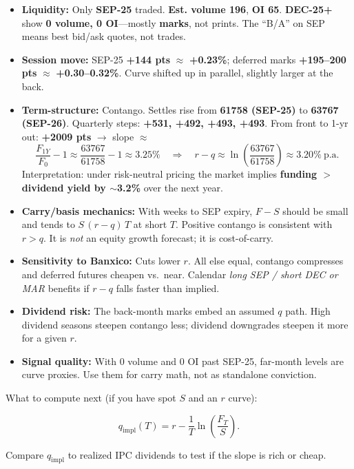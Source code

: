 \documentclass[11pt,a4paper]{article} %
\begin{document}
\begin{itemize}
  \item \textbf{Liquidity:} Only \textbf{SEP-25} traded. \textbf{Est. volume 196}, \textbf{OI 65}. \textbf{DEC-25+} show \textbf{0 volume, 0 OI}---mostly \textbf{marks}, not prints. The ``B/A'' on SEP means best bid/ask quotes, not trades.
  \item \textbf{Session move:} SEP-25 \textbf{+144 pts} $\approx$ \textbf{+0.23\%}; deferred marks \textbf{+195--200 pts} $\approx$ \textbf{+0.30--0.32\%}. Curve shifted up in parallel, slightly larger at the back.
  \item \textbf{Term-structure:} Contango. Settles rise from \textbf{61758 (SEP-25)} to \textbf{63767 (SEP-26)}. Quarterly steps: \textbf{+531, +492, +493, +493}. From front to 1-yr out: \textbf{+2009 pts} $\rightarrow$ slope $\approx$
  \[
    \frac{F_{1Y}}{F_{0}}-1 \approx \frac{63767}{61758}-1 \approx 3.25\%
    \quad\Rightarrow\quad
    r-q \approx \ln\left(\frac{63767}{61758}\right)\approx 3.20\%~\text{p.a.}
  \]
  Interpretation: under risk-neutral pricing the market implies \textbf{funding $>$ dividend yield by $\sim$3.2\%} over the next year.
  \item \textbf{Carry/basis mechanics:} With weeks to SEP expiry, $F-S$ should be small and tends to $S\,(r-q)\,T$ at short $T$. Positive contango is consistent with $r>q$. It is \emph{not} an equity growth forecast; it is cost-of-carry.
  \item \textbf{Sensitivity to Banxico:} Cuts lower $r$. All else equal, contango compresses and deferred futures cheapen vs.\ near. Calendar \emph{long SEP / short DEC or MAR} benefits if $r-q$ falls faster than implied.
  \item \textbf{Dividend risk:} The back-month marks embed an assumed $q$ path. High dividend seasons steepen contango less; dividend downgrades steepen it more for a given $r$.
  \item \textbf{Signal quality:} With 0 volume and 0 OI past SEP-25, far-month levels are curve proxies. Use them for carry math, not as standalone conviction.
\end{itemize}

What to compute next (if you have spot $S$ and an $r$ curve):

\[
q_{\text{impl}}(T)=r-\frac{1}{T}\ln\left(\frac{F_T}{S}\right).
\]

Compare $q_{\text{impl}}$ to realized IPC dividends to test if the slope is rich or cheap.
\end{document}
